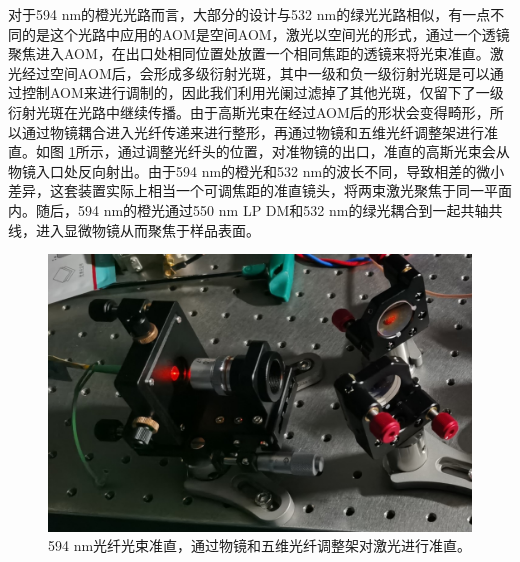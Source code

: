 \documentclass[type = bachelor, oneside]{whu-thesis}
\begin{document}
对于594 nm的橙光光路而言，大部分的设计与532 nm的绿光光路相似，有一点不同的是这个光路中应用的AOM是空间AOM，激光以空间光的形式，通过一个透镜聚焦进入AOM，在出口处相同位置处放置一个相同焦距的透镜来将光束准直。激光经过空间AOM后，会形成多级衍射光斑，其中一级和负一级衍射光斑是可以通过控制AOM来进行调制的，因此我们利用光阑过滤掉了其他光斑，仅留下了一级衍射光斑在光路中继续传播。由于高斯光束在经过AOM后的形状会变得畸形，所以通过物镜耦合进入光纤传递来进行整形，再通过物镜和五维光纤调整架进行准直。如图 \ref{fig: 594 Collimator}所示，通过调整光纤头的位置，对准物镜的出口，准直的高斯光束会从物镜入口处反向射出。由于594 nm的橙光和532 nm的波长不同，导致相差的微小差异，这套装置实际上相当一个可调焦距的准直镜头，将两束激光聚焦于同一平面内。随后，594 nm的橙光通过550 nm LP DM和532 nm的绿光耦合到一起共轴共线，进入显微物镜从而聚焦于样品表面。
\begin{figure}
  \centering
  \includegraphics[width=1.0\textwidth]{figures/Chapter 2/594 Collimator.jpg}
  \caption[594 nm光纤光束准直]{594 nm光纤光束准直，通过物镜和五维光纤调整架对激光进行准直。}
  \label{fig: 594 Collimator}
\end{figure}
\end{document}
